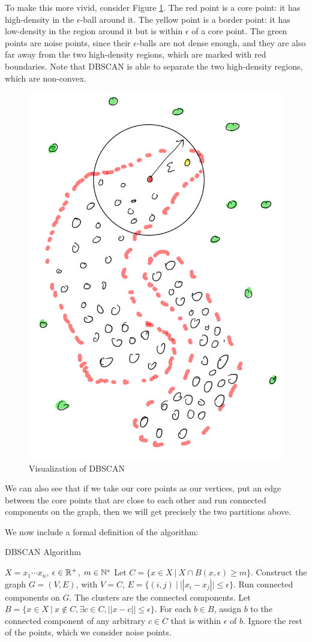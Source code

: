   To make this more vivid, consider Figure \ref{fig:dbscan}. The red point is a core point:
  it has high-density in the $\epsilon$-ball around it. The yellow point is a border
  point: it has low-density in the region around it but is within $\epsilon$ of
  a core point. The green points are noise points, since their $\epsilon$-balls
  are not dense enough, and they are also far away from the two high-density
  regions, which are marked with red boundaries. Note that DBSCAN is able
  to separate the two high-density regions, which are non-convex.

  \begin{figure}[h]
  \centering
  \includegraphics[width=.4\linewidth]{chapter_2/files/dbscan.png}
  \caption{Visualization of DBSCAN}
  \label{fig:dbscan}
  \end{figure}

  We can also see that if we take our core points as our vertices, put an edge between
  the core points that are close to each other and run connected components on
  the graph, then we will get precisely the two partitions above.

  We now include a formal definition of the algorithm:

  \begin{algorithm}[H]
    \caption{DBSCAN Algorithm}
    \label{dbscan alg}
    \begin{algorithmic}[1]
      \renewcommand\algorithmicrequire{\textbf{input}}
      \REQUIRE $X = {x_1\cdots x_n}$, $\epsilon \in \mathbb{R}^+$, $m \in \mathbb{N}^*$
      \STATE Let $C=\{x \in X \ | \ X \cap B(x, \epsilon) \geq m\}$.
      \STATE Construct the graph $G=(V,E)$, with $V=C$, $E=\{(i,j) \ | \ ||x_i-x_j|| \leq \epsilon\}$.
      \STATE Run connected components on $G$. The clusters are the connected components.
      \STATE Let $B=\{x \in X \ | \ x \notin C, \exists c \in C, ||x-c|| \leq \epsilon\}$.
      For each $b \in B$, assign $b$ to the connected component of any arbitrary $c \in C$
      that is within $\epsilon$ of $b$.
      \STATE Ignore the rest of the points, which we consider noise points.
    \end{algorithmic}
  \end{algorithm}

